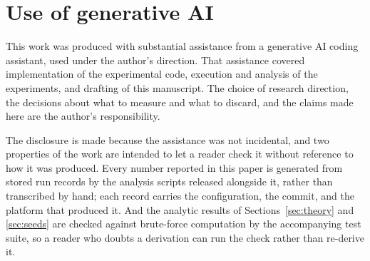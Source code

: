 \section*{Use of generative AI}

This work was produced with substantial assistance from a generative AI coding assistant, used
under the author's direction. That assistance covered implementation of the experimental code,
execution and analysis of the experiments, and drafting of this manuscript. The choice of research
direction, the decisions about what to measure and what to discard, and the claims made here are
the author's responsibility.

The disclosure is made because the assistance was not incidental, and two properties of the work
are intended to let a reader check it without reference to how it was produced. Every number
reported in this paper is generated from stored run records by the analysis scripts released
alongside it, rather than transcribed by hand; each record carries the configuration, the commit,
and the platform that produced it. And the analytic results of Sections~\ref{sec:theory} and
\ref{sec:seeds} are checked against brute-force computation by the accompanying test suite, so a
reader who doubts a derivation can run the check rather than re-derive it.
